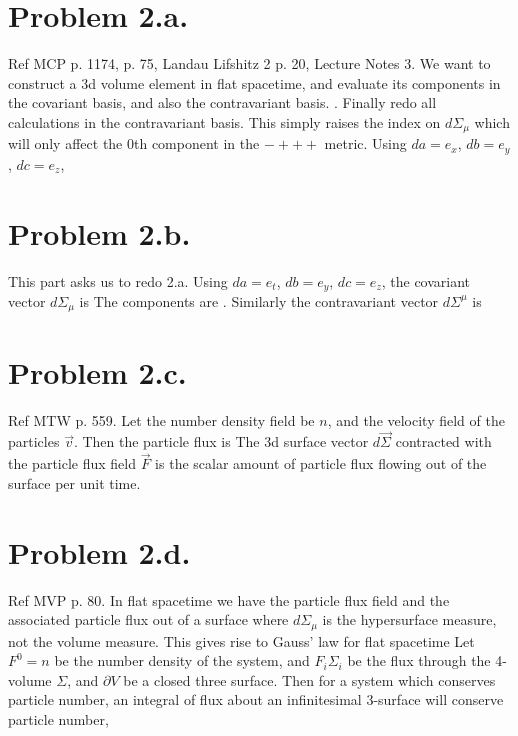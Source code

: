 \documentclass{article}
\begin{document}
\section*{Problem 2.a.}
Ref MCP p. 1174, p. 75, Landau Lifshitz 2 p. 20, Lecture Notes 3. We want to construct a 3d volume element in flat spacetime, and evaluate its components in the covariant basis, and also the contravariant basis.
. Finally redo all calculations in the contravariant basis. This simply raises the index on $d\Sigma_\mu$ which will only affect the 0th component in the $-+++$ metric. Using $da=e_x$, $db=e_y$, $dc=e_z$,
\section*{Problem 2.b.}
This part asks us to redo 2.a. Using $da=e_t$, $db=e_y$, $dc=e_z$, the covariant vector $d\Sigma_\mu$ is
The components are . 
Similarly the contravariant vector $d\Sigma^\mu$ is
\section*{Problem 2.c.}
Ref MTW p. 559. Let the number density field be $n$, and the velocity field of the particles $\vec{v}$. Then the particle flux is 
The 3d surface vector $d\vec{\Sigma}$ contracted with the particle flux field $\vec{F}$ is the scalar amount of particle flux flowing out of the surface per unit time.
\section*{Problem 2.d.}
Ref MVP p. 80. In flat spacetime we have the particle flux field
and the associated particle flux out of a surface
where $d\Sigma_\mu$ is the hypersurface measure, not the volume measure. This gives rise to Gauss' law for flat spacetime
Let $F^0=n$ be the number density of the system, and $F_i \Sigma_i$ be the flux through the 4-volume $\Sigma$, and $\partial V$ be a closed three surface. Then for a system which conserves particle number, an integral of flux about an infinitesimal 3-surface will conserve particle number,
\end{document}
